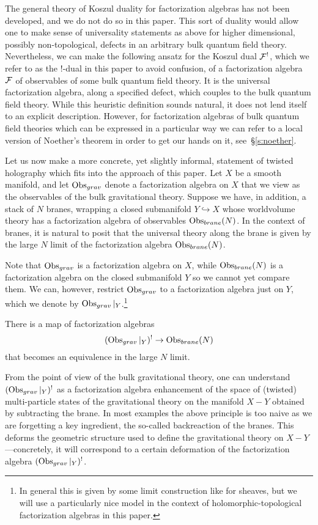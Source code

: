 \documentclass[11pt]{amsart}
\begin{document}
The general theory of Koszul duality for factorization algebras has not been developed, and we do not do so in this paper.
This sort of duality would allow one to make sense of universality statements as above for higher dimensional, possibly non-topological, defects in an arbitrary bulk quantum field theory.
Nevertheless, we can make the following ansatz for the Koszul dual $\mathcal F^!$, which we refer to as the $!$-dual in this paper to avoid confusion, of a factorization algebra~$\mathcal F$ of observables of some bulk quantum field theory.
It is the universal factorization algebra, along a specified defect, which couples to the bulk quantum field theory.
While this heuristic definition sounds natural, it does not lend itself to an explicit description.
However, for factorization algebras of bulk quantum field theories which can be expressed in a particular way we can refer to a local version of Noether's theorem in order to get our hands on it, see~\S\ref{s:noether}.

Let us now make a more concrete, yet slightly informal, statement of twisted holography which fits into the approach of this paper.
Let $X$ be a smooth manifold, and let $\operatorname{Obs}_{grav}$ denote a factorization algebra on $X$ that we view as the observables of the bulk gravitational theory. 
Suppose we have, in addition, a stack of $N$ branes, wrapping a closed submanifold $Y\hookrightarrow X$ whose worldvolume theory has a factorization algebra of observables $\operatorname{Obs}_{brane}(N)$.
In the context of branes, it is natural to posit that the universal theory along the brane is given by the large $N$ limit of the factorization algebra $\operatorname{Obs}_{brane}(N)$.

Note that $\operatorname{Obs}_{grav}$ is a factorization algebra on $X$, while $\operatorname{Obs}_{brane}(N)$ is a factorization algebra on the closed submanifold $Y$ so we cannot yet compare them.
We can, however, restrict $\operatorname{Obs}_{grav}$ to a factorization algebra just on $Y$, which we denote by $\operatorname{Obs}_{grav}|_Y$.\footnote{In general this is given by some limit construction like for sheaves, but we will use a particularly nice model in the context of holomorphic-topological factorization algebras in this paper.}

\begin{expect}
There is a map of factorization algebras
\[
  (\operatorname{Obs}_{grav}|_{Y})^{!}\to \operatorname{Obs}_{brane}(N)
\]
that becomes an equivalence in the large $N$ limit.
\end{expect}

From the point of view of the bulk gravitational theory, one can understand $(\operatorname{Obs}_{grav}|_{Y})^{!}$ as a factorization algebra enhancement of the space of (twisted) multi-particle states of the gravitational theory on the manifold $X - Y$ obtained by subtracting the brane. 
In most examples the above principle is too naive as we are forgetting a key ingredient, the so-called backreaction of the branes. 
This deforms the geometric structure used to define the gravitational theory on $X - Y$---concretely, it will correspond to a certain deformation of the factorization algebra $(\operatorname{Obs}_{grav}|_{Y})^{!}$. 
\end{document}
